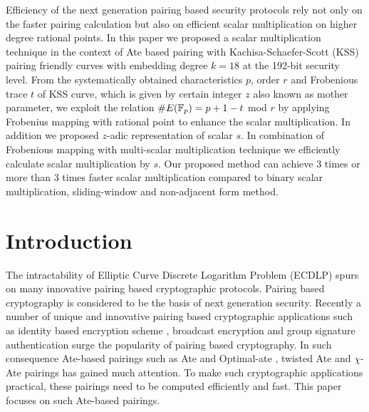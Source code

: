 Efficiency of the next generation pairing based security protocols rely not only on the faster pairing calculation but also on efficient scalar multiplication on higher degree rational points. 
In this paper we proposed a scalar multiplication technique in the context of Ate based pairing with  Kachisa-Schaefer-Scott (KSS) pairing friendly curves with embedding degree $k = 18$ at the 192-bit security level.
From the systematically obtained characteristics $p$, order $r$ and Frobenious trace $t$ of KSS curve, which is given by certain integer $z$ also known as mother parameter, we exploit the relation $\#E({\mathbb{F}}_{p}) = p+1-t$ mod $r$  by applying Frobenius mapping with rational point to enhance the scalar multiplication.
In addition we proposed $z$-adic representation of scalar $s$.
In combination of Frobenious mapping with multi-scalar multiplication technique we efficiently calculate scalar multiplication by $s$.
Our proposed method can achieve 3 times or more than 3 times faster scalar multiplication compared to binary scalar multiplication, sliding-window and non-adjacent form method.


\section{Introduction}
The intractability of Elliptic Curve Discrete Logarithm Problem (ECDLP) spurs on many innovative pairing based cryptographic protocols.
Pairing based cryptography is considered to be the basis of next generation security. 
Recently a number of unique and innovative pairing based cryptographic applications such as identity based encryption scheme \cite{id_based}, broadcast encryption \cite{boradcast} and group signature authentication \cite{group_sign_1} surge the popularity of pairing based cryptography. 
In such consequence Ate-based pairings such as Ate \cite{ate} and Optimal-ate \cite{op_ate_p}, twisted Ate  \cite{twisted_ate} and $\chi$-Ate \cite{chibasedBN} pairings has gained much attention. 
To make such cryptographic applications practical, these pairings need to be computed efficiently and fast. 
This paper focuses on such  Ate-based pairings. 

